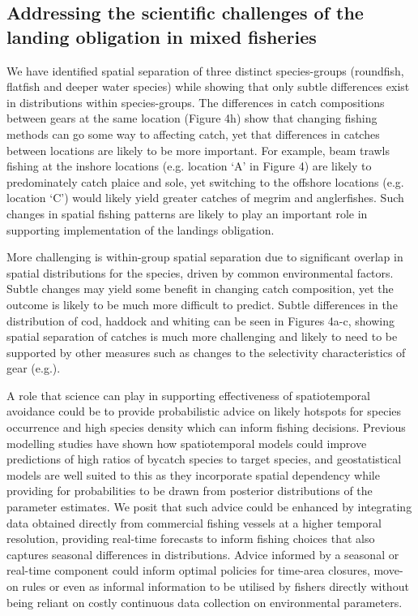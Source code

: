 \documentclass{nature}
\begin{document}
\begin{linenumbers}
\subsection{Addressing the scientific challenges of the landing obligation in
	mixed fisheries}  We have
identified spatial separation of three distinct species-groups (roundfish,
flatfish and deeper water species) while showing that only subtle differences
exist in distributions within species-groups. The differences in catch
compositions between gears at the same location (Figure 4h) show that changing
fishing methods can go some way to affecting catch, yet that differences in
catches between locations are likely to be more important. For example, beam
trawls fishing at the inshore locations (e.g. location `A' in Figure 4) are
likely to predominately catch plaice and sole, yet switching to the offshore
locations (e.g. location `C') would likely yield greater catches of megrim and
anglerfishes.  Such changes in spatial fishing patterns are likely to play an
important role in supporting implementation of the landings obligation.

More challenging is within-group spatial separation due to significant overlap
in spatial distributions for the species, driven by common environmental
factors. Subtle changes may yield some benefit in changing catch composition,
yet the outcome is likely to be much more difficult to predict. 
Subtle differences in the distribution of cod, haddock and whiting can be seen
in Figures 4a-c, showing spatial separation of catches is much more challenging
and likely to need to be supported by other measures such as changes to the
selectivity characteristics of gear (e.g.\cite{Santos2016}). 

A role that science can play in supporting effectiveness of spatiotemporal
avoidance could be to provide probabilistic advice on likely hotspots for
species occurrence and high species density which can inform fishing decisions.
Previous modelling studies have shown how spatiotemporal models could improve
predictions of high ratios of bycatch species to target species\cite{Ward2015,
	Cosandey-Godin2015, Breivik2016}, and geostatistical models are well
suited to this as they incorporate spatial dependency while providing for
probabilities to be drawn from posterior distributions of the parameter
estimates.  We posit that such advice could be enhanced by integrating data
obtained directly from commercial fishing vessels at a higher temporal
resolution, providing real-time forecasts to inform fishing choices that also
captures seasonal differences in distributions.  Advice informed by  a
seasonal or real-time component could inform optimal policies for time-area
closures, move-on rules or even as informal information to be utilised by
fishers directly without being reliant on costly continuous data collection on
environmental parameters.


\end{linenumbers}
\end{document}
